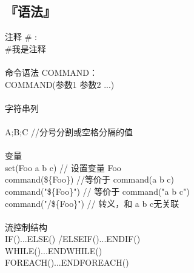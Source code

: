\documentclass[11pt,a4paper,titlepage]{article}
\begin{document}
\subsection{\kai 『语法』}
注释  \# :   \\
    \#我是注释\\
\\
命令语法 COMMAND：\\
    COMMAND(参数1 参数2 ...)\\
\\
字符串列\\
\\
    A;B;C   //分号分割或空格分隔的值 \\
\\
变量\\
    set(Foo a b c)     // 设置变量 Foo\\
    command(\$\{Foo\})     //等价于 command(a b c)\\
    command("\$\{Foo\}")  // 等价于 command("a b c")\\
    command("/\$\{Foo\}") // 转义，和 a b c无关联\\
\\
流控制结构\\
    IF()...ELSE()  /ELSEIF()...ENDIF()\\
    WHILE()...ENDWHILE()\\
    FOREACH()...ENDFOREACH()\\
\end{document}
